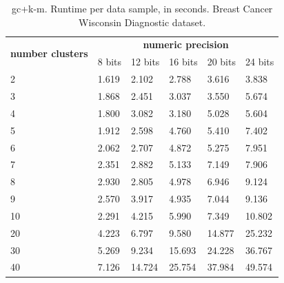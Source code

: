 \begin{table}[htp]
\centering
\caption{\acs{gc}+\acs{k-m}. Runtime per data sample, in seconds. Breast Cancer Wisconsin Diagnostic dataset.}
\label{table:runtimeKMBCW}
\begin{tabular}{|l|l|l|l|l|l|}
\hline
\multirow{2}{*}{\textbf{number clusters}} & \multicolumn{5}{c|}{\textbf{numeric precision}}                                             \\ \cline{2-6} 
                                          & 8 bits & 12 bits & 16 bits & 20 bits & 24 bits \\ \hline
2                                & 1.619           & 2.102            & 2.788            & 3.616            & 3.838            \\ \hline
3                                & 1.868           & 2.451            & 3.037            & 3.550            & 5.674            \\ \hline
4                                & 1.800           & 3.082            & 3.180            & 5.028            & 5.604            \\ \hline
5                                & 1.912           & 2.598            & 4.760            & 5.410            & 7.402            \\ \hline
6                                & 2.062           & 2.707            & 4.872            & 5.275            & 7.951            \\ \hline
7                                & 2.351           & 2.882            & 5.133            & 7.149            & 7.906            \\ \hline
8                                & 2.930           & 2.805            & 4.978            & 6.946            & 9.124            \\ \hline
9                                & 2.570           & 3.917            & 4.935            & 7.044            & 9.136            \\ \hline
10                               & 2.291           & 4.215            & 5.990            & 7.349            & 10.802           \\ \hline
20                               & 4.223           & 6.797            & 9.580            & 14.877           & 25.232           \\ \hline
30                               & 5.269           & 9.234            & 15.693           & 24.228           & 36.767           \\ \hline
40                               & 7.126           & 14.724           & 25.754           & 37.984           & 49.574           \\ \hline

\end{tabular}
\end{table}
